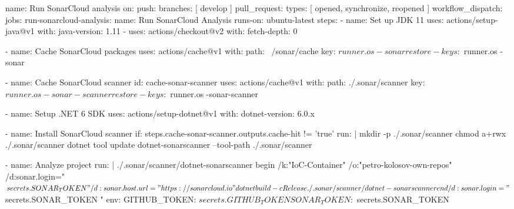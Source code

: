 \begin{spverbatim}
name: Run SonarCloud analysis
on:
  push:
    branches: [ develop ]
  pull_request:
    types: [ opened, synchronize, reopened ]
  workflow_dispatch:
jobs:
  run-sonarcloud-analysis:
    name: Run SonarCloud Analysis
    runs-on: ubuntu-latest
    steps:
      - name: Set up JDK 11
        uses: actions/setup-java@v1
        with:
          java-version: 1.11
      - uses: actions/checkout@v2
        with:
          fetch-depth: 0

      - name: Cache SonarCloud packages
        uses: actions/cache@v1
        with:
          path: ~/sonar/cache
          key: ${{ runner.os }}-sonar
          restore-keys: ${{ runner.os }}-sonar

      - name: Cache SonarCloud scanner
        id: cache-sonar-scanner
        uses: actions/cache@v1
        with:
          path: ./.sonar/scanner
          key: ${{ runner.os }}-sonar-scanner
          restore-keys: ${{ runner.os }}-sonar-scanner

      - name: Setup .NET 6 SDK
        uses: actions/setup-dotnet@v1
        with:
          dotnet-version: 6.0.x

      - name: Install SonarCloud scanner
        if: steps.cache-sonar-scanner.outputs.cache-hit != 'true'
        run: |
          mkdir -p ./.sonar/scanner
          chmod a+rwx ./.sonar/scanner
          dotnet tool update dotnet-sonarscanner --tool-path ./.sonar/scanner

      - name: Analyze project
        run: |
          ./.sonar/scanner/dotnet-sonarscanner begin /k:"IoC-Container" /o:"petro-kolosov-own-repos" /d:sonar.login="${{ secrets.SONAR_TOKEN }}" /d:sonar.host.url="https://sonarcloud.io"
          dotnet build -c Release
          ./.sonar/scanner/dotnet-sonarscanner end /d:sonar.login="${{ secrets.SONAR_TOKEN }}"
        env:
          GITHUB_TOKEN: ${{ secrets.GITHUB_TOKEN }}
          SONAR_TOKEN: ${{ secrets.SONAR_TOKEN }}
\end{spverbatim}